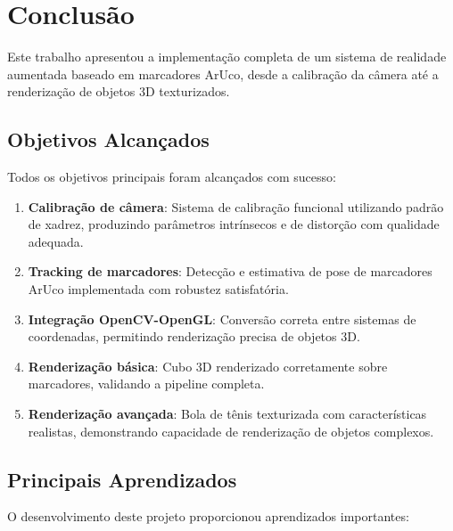\section{Conclusão}
\label{sec:conclusao}

Este trabalho apresentou a implementação completa de um sistema de realidade aumentada baseado em marcadores ArUco, desde a calibração da câmera até a renderização de objetos 3D texturizados.

\subsection{Objetivos Alcançados}

Todos os objetivos principais foram alcançados com sucesso:

\begin{enumerate}
    \item \textbf{Calibração de câmera}: Sistema de calibração funcional utilizando padrão de xadrez, produzindo parâmetros intrínsecos e de distorção com qualidade adequada.
    
    \item \textbf{Tracking de marcadores}: Detecção e estimativa de pose de marcadores ArUco implementada com robustez satisfatória.
    
    \item \textbf{Integração OpenCV-OpenGL}: Conversão correta entre sistemas de coordenadas, permitindo renderização precisa de objetos 3D.
    
    \item \textbf{Renderização básica}: Cubo 3D renderizado corretamente sobre marcadores, validando a pipeline completa.
    
    \item \textbf{Renderização avançada}: Bola de tênis texturizada com características realistas, demonstrando capacidade de renderização de objetos complexos.
\end{enumerate}

\subsection{Principais Aprendizados}

O desenvolvimento deste projeto proporcionou aprendizados importantes:

